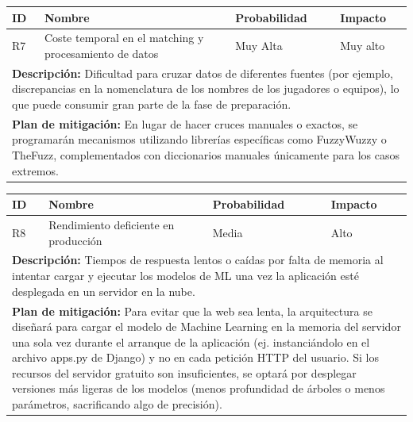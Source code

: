 \begin{center}
\small
\begin{tabular}{|p{}|p{}|p{}|p{}|}
\hline
\textbf{ID} & \textbf{Nombre} & \textbf{Probabilidad} & \textbf{Impacto} \\
\hline
R7 & Coste temporal en el matching y procesamiento de datos & Muy Alta & Muy alto \\
\hline
\multicolumn{4}{|p{0.9\textwidth}|}{\textbf{Descripción:} Dificultad para cruzar datos de diferentes fuentes (por ejemplo, discrepancias en la nomenclatura de los nombres de los jugadores o equipos), lo que puede consumir gran parte de la fase de preparación.} \\
\hline
\multicolumn{4}{|p{0.9\textwidth}|}{\textbf{Plan de mitigación:} En lugar de hacer cruces manuales o exactos, se programarán mecanismos utilizando librerías específicas como FuzzyWuzzy o TheFuzz, complementados con diccionarios manuales únicamente para los casos extremos.} \\
\hline
\end{tabular}
\end{center}

\vspace{0.3cm}

\begin{center}
\small
\begin{tabular}{|p{}|p{}|p{}|p{}|}
\hline
\textbf{ID} & \textbf{Nombre} & \textbf{Probabilidad} & \textbf{Impacto} \\
\hline
R8 & Rendimiento deficiente en producción & Media & Alto \\
\hline
\multicolumn{4}{|p{0.9\textwidth}|}{\textbf{Descripción:} Tiempos de respuesta lentos o caídas por falta de memoria al intentar cargar y ejecutar los modelos de ML una vez la aplicación esté desplegada en un servidor en la nube.} \\
\hline
\multicolumn{4}{|p{0.9\textwidth}|}{\textbf{Plan de mitigación:} Para evitar que la web sea lenta, la arquitectura se diseñará para cargar el modelo de Machine Learning en la memoria del servidor una sola vez durante el arranque de la aplicación (ej. instanciándolo en el archivo apps.py de Django) y no en cada petición HTTP del usuario. Si los recursos del servidor gratuito son insuficientes, se optará por desplegar versiones más ligeras de los modelos (menos profundidad de árboles o menos parámetros, sacrificando algo de precisión).} \\
\hline
\end{tabular}
\end{center}

